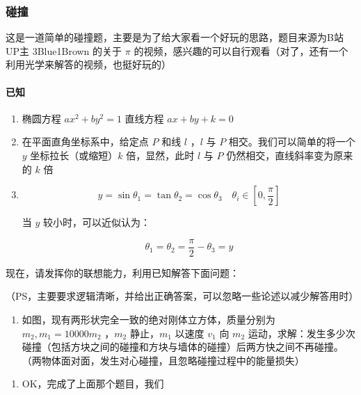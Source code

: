 \documentclass[
]{article}
\author{}
\date{}
\begin{document}
\hypertarget{ux78b0ux649e}{%
\subsubsection{碰撞}\label{ux78b0ux649e}}

这是一道简单的碰撞题，主要是为了给大家看一个好玩的思路，题目来源为B站UP主
3Blue1Brown 的关于 \(\pi\)
的视频，感兴趣的可以自行观看（对了，还有一个利用光学来解答的视频，也挺好玩的）

\hypertarget{ux5df2ux77e5}{%
\paragraph{已知}\label{ux5df2ux77e5}}

\begin{enumerate}
\def\labelenumi{\arabic{enumi}.}
\item
  椭圆方程 \(ax^2+by^2=1\) 直线方程 \(ax+by+k=0\)
\item
  在平面直角坐标系中，给定点 \(P\) 和线 \(l\) ，\(l\) 与 \(P\)
  相交。我们可以简单的将一个 \(y\) 坐标拉长（或缩短）\(k\)
  倍，显然，此时 \(l\) 与 \(P\) 仍然相交，直线斜率变为原来的 \(k\) 倍
\item
  \[y = \sin \theta_1 = \tan \theta_2 = \cos \theta_3\quad \theta_i\in[0,\frac{\pi}{2}]\]

  当 \(y\) 较小时，可以近似认为：

  \[\theta_1=\theta_2=\frac{\pi}{2}-\theta_3=y\]
\end{enumerate}

现在，请发挥你的联想能力，利用已知解答下面问题：

（PS，主要要求逻辑清晰，并给出正确答案，可以忽略一些论述以减少解答用时）

\begin{enumerate}
\def\labelenumi{\arabic{enumi}.}
\item
  如图，现有两形状完全一致的绝对刚体立方体，质量分别为
  \(m_2,m_1 = 10000m_2\) ，\(m_2\) 静止，\(m_1\) 以速度 \(v_1\) 向
  \(m_2\)
  运动，求解：发生多少次碰撞（包括方块之间的碰撞和方块与墙体的碰撞）后两方快之间不再碰撞。（两物体面对面，发生对心碰撞，且忽略碰撞过程中的能量损失）
\end{enumerate}

\begin{enumerate}
\def\labelenumi{\arabic{enumi}.}
\item
  OK，完成了上面那个题目，我们
\end{enumerate}
\end{document}
